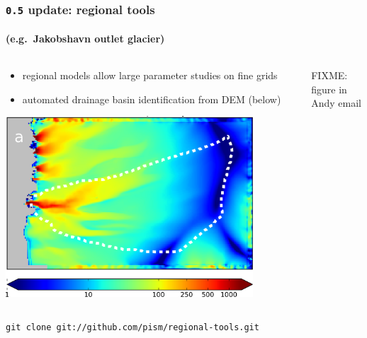 \documentclass[hide notes,intlimits]{beamer}
\begin{document}
\begin{frame}
  \frametitle{\texttt{0.5} update: regional tools}
  \framesubtitle{(e.g.~Jakobshavn outlet glacier)}
  
\begin{columns}
\begin{column}{0.5\textwidth}
\begin{itemize}
\vspace{-2mm}
\small
\item regional models allow large parameter studies on fine grids
\item automated drainage basin identification from DEM (below)
\end{itemize}

\vspace{2mm}

  \includegraphics[width=0.85\textwidth]{jako_3km}

\end{column}

\begin{column}{0.5\textwidth}
FIXME: figure in Andy email
\end{column}
\end{columns}

\begin{center}
\scriptsize \texttt{git clone git://github.com/pism/regional-tools.git}
\end{center}
\end{frame}
\end{document}
